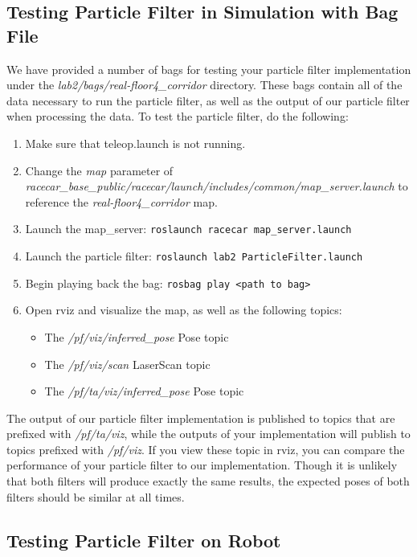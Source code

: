 \documentclass[final]{article}
\begin{document}
\subsection{Testing Particle Filter in Simulation with Bag File}
\label{sec:test_pf_sim_bag}
We have provided a number of bags for testing your particle filter implementation under the \textit{lab2/bags/real-floor4\_corridor} directory. These bags contain all of the data necessary to run the particle filter, as well as the output of our particle filter when processing the data. 
To test the particle filter, do the following:
\begin{enumerate}
\item Make sure that teleop.launch is not running.
\item Change the \textit{map} parameter of \textit{racecar\_base\_public/racecar/launch/includes/common/map\_server.launch} to reference the \textit{real-floor4\_corridor} map. 
\item Launch the map\_server: \texttt{roslaunch racecar map\_server.launch}
\item Launch the particle filter: \texttt{roslaunch lab2 ParticleFilter.launch}
\item Begin playing back the bag: \texttt{rosbag play <path to bag>}
\item Open rviz and visualize the map, as well as the following topics:
	\begin{itemize}
		\item The \textit{/pf/viz/inferred\_pose} Pose topic
		\item The \textit{/pf/viz/scan} LaserScan topic
		\item The \textit{/pf/ta/viz/inferred\_pose} Pose topic
	\end{itemize}
\end{enumerate} 

The output of our particle filter implementation is published to topics that are prefixed with \textit{/pf/ta/viz}, while the outputs of your implementation will publish to topics prefixed with \textit{/pf/viz}. If you view these topic in rviz, you can compare the performance of your particle filter to our implementation. Though it is unlikely that both filters will produce exactly the same results, the expected poses of both filters should be similar at all times.

\subsection{Testing Particle Filter on Robot}
\end{document}
